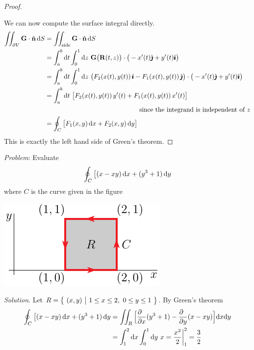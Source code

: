 \begin{proof}
\begin{nfig}
\begin{center}
\end{center}
\end{nfig}
We can now compute the surface integral directly.
\begin{align*}
\dblInt_{\partial V} \vG\cdot\hn\,\dee{S}
&=\dblInt_{\text{side}} \vG\cdot\hn\,\dee{S}  \\
&=\int_a^b\dee{t}\int_0^1\dee{z}\ \vG\big(\vR(t,z)\big)\cdot 
          \big(-x'(t)\hj +y'(t)\hi\big)
\\
&=\int_a^b\dee{t}\int_0^1\dee{z}\ 
         \big(F_2(x(t),y(t))\,\hi -F_1(x(t),y(t))\,\hj\big)\cdot 
          \big(-x'(t)\hj +y'(t)\hi\big) \\
&=\int_a^b\dee{t}\ 
         \big[F_2(x(t),y(t))\,y'(t) +F_1(x(t),y(t))\,x'(t)\big]
\\
&\hskip2in \text{since the integrand is independent of $z$}
\\
&=\oint_{C} \big[F_1(x,y)\,\dee{x} +F_2(x,y)\,\dee{y}\big]
\end{align*}
This is exactly the left 
hand side of Green's theorem.
\end{proof}


\begin{eg}\label{eg:greenA}
\noindent\textit{Problem}:
Evaluate
\begin{equation*}
\oint_C\big[(x-xy)\,\mathrm{d}x + (y^3+1)\,\mathrm{d}y
\end{equation*}
where $C$ is the curve given in the figure
\begin{nfig}
\begin{center}
   \includegraphics{greensSquare.pdf}
\end{center}
\end{nfig}
\medskip
\noindent\textit{Solution}. Let $R=\big\{ \ (x,y)\ \big|\ 1\le x\le 2,\ 0\le y\le 1\ \big\}$.
By Green's theorem
\begin{align*}
\oint_C\big[(x-xy)\,\dee{x} + (y^3+1)\,\dee{y}
&=\dblInt_R\Big[\frac{\partial\hfill}{\partial x}(y^3+1) 
                - \frac{\partial\hfill}{\partial y}(x-xy)\Big]\dee{x}\dee{y}\\
&=\int_1^2\dee{x}\int_0^1\dee{y}\ x
=\frac{x^2}{2}\bigg|_1^2
=\frac{3}{2}
\end{align*}
\end{eg}

